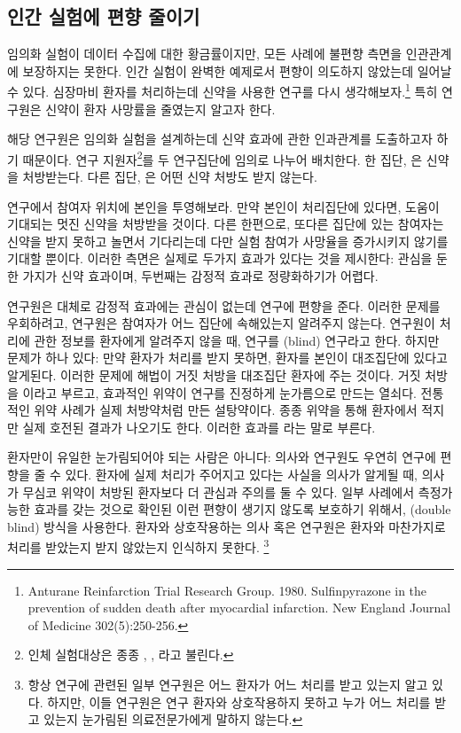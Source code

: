\subsection{인간 실험에 편향 줄이기}
\label{biasInHumanExperiments}

임의화 실험이 데이터 수집에 대한 황금률이지만, 모든 사례에 불편향 측면을 인관관계에 보장하지는 못한다.
인간 실험이 완벽한 예제로서 편향이 의도하지 않았는데 일어날 수 있다.
심장마비 환자를 처리하는데 신약을 사용한 연구를 다시 생각해보자.\footnote{Anturane Reinfarction Trial Research Group. 1980. Sulfinpyrazone in the prevention of sudden death after myocardial infarction. New England Journal of Medicine 302(5):250-256.}
특히 연구원은 신약이 환자 사망률을 줄였는지 알고자 한다.

해당 연구원은 임의화 실험을 설계하는데 신약 효과에 관한 인과관계를 도출하고자 하기 때문이다.
연구 지원자\footnote{인체 실험대상은 종종 , , 라고 불린다.}를 두 연구집단에 임의로 나누어 배치한다. 한 집단, 은 신약을 처방받는다. 다른 집단, 은 어떤 신약 처방도 받지 않는다.

연구에서 참여자 위치에 본인을 투영해보라.
만약 본인이 처리집단에 있다면, 도움이 기대되는 멋진 신약을 처방받을 것이다.
다른 한편으로, 또다른 집단에 있는 참여자는 신약을 받지 못하고 놀면서 기다리는데 다만 실험 참여가 사망율을 증가시키지 않기를 기대할 뿐이다. 이러한 측면은 실제로 두가지 효과가 있다는 것을 제시한다: 관심을 둔 한 가지가 신약 효과이며, 두번째는 감정적 효과로 정량화하기가 어렵다.

연구원은 대체로 감정적 효과에는 관심이 없는데 연구에 편향을 준다.
이러한 문제를 우회하려고, 연구원은 참여자가 어느 집단에 속해있는지 알려주지 않는다.
연구원이 처리에 관한 정보를 환자에게 알려주지 않을 때, 연구를 (blind) 연구라고 한다.
하지만 문제가 하나 있다: 만약 환자가 처리를 받지 못하면, 환자를 본인이 대조집단에 있다고 알게된다.
이러한 문제에 해법이 거짓 처방을 대조집단 환자에 주는 것이다. 거짓 처방을 이라고 부르고,
효과적인 위약이 연구를 진정하게 눈가름으로 만드는 열쇠다. 전통적인 위약 사례가 실제 처방약처럼 만든 설탕약이다.
종종 위약을 통해 환자에서 적지만 실제 호전된 결과가 나오기도 한다.
이러한 효과를 라는 말로 부른다.

환자만이 유일한 눈가림되어야 되는 사람은 아니다: 의사와 연구원도 우연히 연구에 편향을 줄 수 있다.
환자에 실제 처리가 주어지고 있다는 사실을 의사가 알게될 때, 의사가 무심코 위약이 처방된 환자보다 더 관심과 주의를 둘 수 있다.
일부 사례에서 측정가능한 효과를 갖는 것으로 확인된 이런 편향이 생기지 않도록 보호하기 위해서, (double blind) 방식을 사용한다. 환자와 상호작용하는 의사 혹은 연구원은 환자와 마찬가지로 처리를 받았는지 받지 않았는지 인식하지 못한다.
\footnote{항상 연구에 관련된 일부 연구원은 어느 환자가 어느 처리를 받고 있는지 알고 있다.
하지만, 이들 연구원은 연구 환자와 상호작용하지 못하고 누가 어느 처리를 받고 있는지 눈가림된 의료전문가에게 말하지 않는다.}

